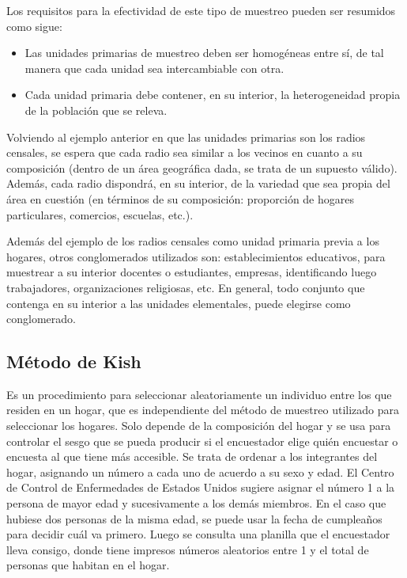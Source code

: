 \documentclass[]{book}
\begin{document}
Los requisitos para la efectividad de este tipo de muestreo pueden ser
resumidos como sigue:

\begin{itemize}
\item
  Las unidades primarias de muestreo deben ser homogéneas entre sí, de
  tal manera que cada unidad sea intercambiable con otra.
\item
  Cada unidad primaria debe contener, en su interior, la heterogeneidad propia de la población que se releva.
\end{itemize}

Volviendo al ejemplo anterior en que las unidades primarias son los radios censales, se espera que cada radio sea similar a los vecinos en cuanto a su composición (dentro de un área geográfica dada, se trata de un supuesto válido). Además, cada radio dispondrá, en su interior, de la
variedad que sea propia del área en cuestión (en términos de su
composición: proporción de hogares particulares, comercios, escuelas, etc.).

Además del ejemplo de los radios censales como unidad primaria previa a los hogares, otros conglomerados utilizados son: establecimientos educativos, para muestrear a su interior docentes o estudiantes, empresas, identificando luego trabajadores, organizaciones religiosas, etc. En general, todo conjunto que contenga en su interior a las unidades elementales, puede elegirse como conglomerado.

\hypertarget{muxe9todo-de-kish}{%
\subsection{Método de Kish}\label{muxe9todo-de-kish}}

Es un procedimiento para seleccionar aleatoriamente un individuo entre los que residen en un hogar, que es independiente del método de muestreo utilizado para seleccionar los hogares. Solo depende de la composición del hogar y se usa para controlar el sesgo que se pueda producir si el encuestador elige quién encuestar o encuesta al que tiene más accesible.
Se trata de ordenar a los integrantes del hogar, asignando un número a cada uno de acuerdo a su sexo y edad. El Centro de Control de Enfermedades de Estados Unidos sugiere asignar el número 1 a la persona de mayor edad y sucesivamente a los demás miembros. En el caso que hubiese dos personas de la misma edad, se puede usar la fecha de cumpleaños para decidir cuál va primero. Luego se consulta una planilla que el encuestador lleva consigo, donde tiene impresos números aleatorios entre 1 y el total de personas que habitan en el hogar.
\end{document}
